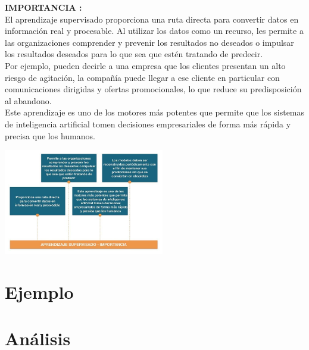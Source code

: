 \documentclass[%
 reprint,
 amsmath,amssymb,
 aps,
]{revtex4-1}
\begin{document}
    \textbf{IMPORTANCIA :} \\
    El aprendizaje supervisado proporciona una ruta directa para convertir datos en información real y procesable. Al utilizar los datos como un recurso, les permite a las organizaciones comprender y prevenir los resultados no deseados o impulsar los resultados deseados para lo que sea que estén tratando de predecir.\\
    Por ejemplo, pueden decirle a una empresa que los clientes presentan un alto riesgo de agitación, la compañía puede llegar a ese cliente en particular con comunicaciones dirigidas y ofertas promocionales, lo que reduce su predisposición al abandono.\\
    Este aprendizaje es uno de los motores más potentes que permite que los sistemas de inteligencia artificial tomen decisiones empresariales de forma más rápida y precisa que los humanos.

 \begin{center}
\includegraphics[width=7cm]{./Imagenes/importancia}
\end{center}



\section{Ejemplo}

\section{Análisis}
\end{document}
